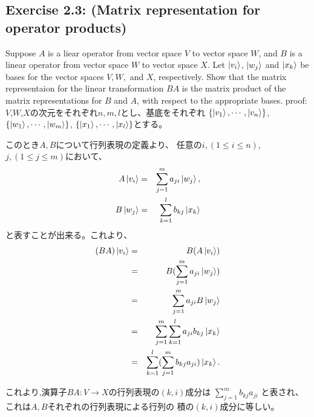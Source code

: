 \setcounter{equation}{0}
\begin{flushleft}
\section{\Large Exercise 2.3: (Matrix representation for operator products)}
Suppose $A$ is a liear operator from vector space $V$ to vector space $W$,
and $B$ is a linear operator from vector space $W$ to vector space $X$.
Let $\ket{v_i}$, $\ket{w_j}$ and $\ket{x_k}$ be bases 
for the vector spaces $V, W,$ and $X$, respectively.
\newline
Show that the matrix representaion for the linear transformation 
$BA$ is the matrix product of the matrix representations for $B$ and $A$, 
with respect to the appropriate bases.
\vspace{0.1in}
\newline
{\large proof:}
\newline
$V$,$W$,$X$の次元をそれぞれ$n, m, l$とし、基底をそれぞれ
$\{\ket{v_1}, \cdots, \ket{v_n}\}$,
$\{\ket{w_1}, \cdots, \ket{w_m}\}$,
$\{\ket{x_1}, \cdots, \ket{x_l}\}$とする。

このとき$A, B$について行列表現の定義より、
任意の$i, (1\leq i\leq n)$, $j, (1\leq j\leq m)$において、
\begin{eqnarray}
A\ket{v_i} &=& \sum_{j=1}^m a_{ji} \ket{w_j}, \\
B\ket{w_j} &=& \sum_{k=1}^l b_{kj} \ket{x_k}
\end{eqnarray}
と表すことが出来る。これより、
\begin{eqnarray*}
(BA)\ket{v_i}
&=& B(A\ket{v_i}) \\
&=& B(\sum_{j=1}^m a_{ji} \ket{w_j}) \\
&=& \sum_{j=1}^m a_{ji} B\ket{w_j} \\
&=& \sum_{j=1}^m \sum_{k=1}^l a_{ji} b_{kj} \ket{x_k} \\
&=& \sum_{k=1}^l (\sum_{j=1}^m b_{kj} a_{ji}) \ket{x_k}.
\end{eqnarray*}

これより,演算子$BA:V \to X$の行列表現の$(k, i)$成分は
$\sum_{j=1}^m b_{kj} a_{ji}$ と表され、これは$A, B$それぞれの行列表現による行列の
積の$(k, i)$成分に等しい。
\end{flushleft}
